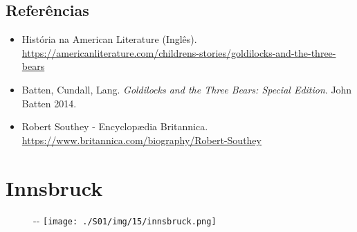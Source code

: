 \hypertarget{referuxeancias-2}{%
\subsection{Referências}\label{referuxeancias-2}}

\begin{itemize}
\tightlist
\item
  \sloppy História na American Literature (Inglês). \url{https://americanliterature.com/childrens-stories/goldilocks-and-the-three-bears}
\item
  Batten, Cundall, Lang. \emph{Goldilocks and the Three Bears: Special
  Edition}. John Batten 2014.
\item
  \sloppy Robert Southey - Encyclopædia Britannica. \url{https://www.britannica.com/biography/Robert-Southey}
\end{itemize}

\hypertarget{innsbruck}{%
\section{Innsbruck}\label{innsbruck}}

\begin{figure}[!ht]
  \begin{adjustwidth}{-\oddsidemargin-1in}{-\rightmargin}
    \centering
    \texttt{[image: ./S01/img/15/innsbruck.png]}
  \end{adjustwidth}
\end{figure}

